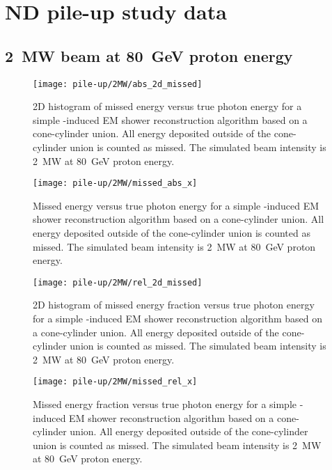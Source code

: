 \chapter{\dune{} ND pile-up study data}
\label{chap:pile-up-data}

\section{\SI{2}{\mega\watt} beam at \SI{80}{\giga\electronvolt} proton energy}

\begin{figure}[htb]
	\centering
	\texttt{[image: pile-up/2MW/abs\_2d\_missed]}
	\caption{2D histogram of missed energy versus true photon energy for a simple \Pgpz-induced EM shower reconstruction algorithm based on a cone-cylinder union.
		All energy deposited outside of the cone-cylinder union is counted as missed.
		The simulated beam intensity is \SI{2}{\mega\watt} at \SI{80}{\giga\electronvolt} proton energy.}
\end{figure}

\begin{figure}[htb]
	\centering
	\texttt{[image: pile-up/2MW/missed\_abs\_x]}
	\caption{Missed energy versus true photon energy for a simple \Pgpz-induced EM shower reconstruction algorithm based on a cone-cylinder union.
		All energy deposited outside of the cone-cylinder union is counted as missed.
		The simulated beam intensity is \SI{2}{\mega\watt} at \SI{80}{\giga\electronvolt} proton energy.}
\end{figure}

\begin{figure}[htb]
	\centering
	\texttt{[image: pile-up/2MW/rel\_2d\_missed]}
	\caption{2D histogram of missed energy fraction versus true photon energy for a simple \Pgpz-induced EM shower reconstruction algorithm based on a cone-cylinder union.
		All energy deposited outside of the cone-cylinder union is counted as missed.
		The simulated beam intensity is \SI{2}{\mega\watt} at \SI{80}{\giga\electronvolt} proton energy.}
\end{figure}

\begin{figure}[htb]
	\centering
	\texttt{[image: pile-up/2MW/missed\_rel\_x]}
	\caption{Missed energy fraction versus true photon energy for a simple \Pgpz-induced EM shower reconstruction algorithm based on a cone-cylinder union.
		All energy deposited outside of the cone-cylinder union is counted as missed.
		The simulated beam intensity is \SI{2}{\mega\watt} at \SI{80}{\giga\electronvolt} proton energy.}
\end{figure}


